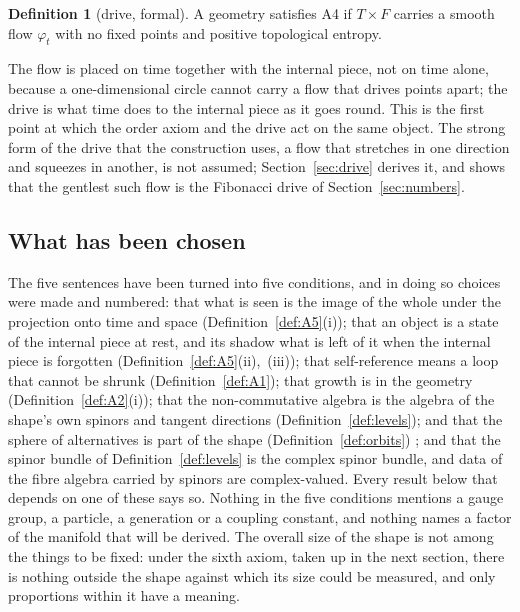 \documentclass[11pt,a4paper]{article}
\theoremstyle{plain}
\theoremstyle{definition}
\newtheorem{definition}[theorem]{Definition}
\theoremstyle{remark}
\begin{document}
\begin{definition}[drive, formal]\label{def:A4}
A geometry satisfies A4 if $T\times F$ carries a smooth flow $\varphi_{t}$ with no fixed points and positive topological entropy.
\end{definition}

The flow is placed on time together with the internal piece, not on time alone, because a one-dimensional circle cannot carry a flow that drives points apart; the drive is what time does to the internal piece as it goes round. This is the first point at which the order axiom and the drive act on the same object. The strong form of the drive that the construction uses, a flow that stretches in one direction and squeezes in another, is not assumed; Section~\ref{sec:drive} derives it, and shows that the gentlest such flow is the Fibonacci drive of Section~\ref{sec:numbers}.

\subsection{What has been chosen}\label{sec:scope}

The five sentences have been turned into five conditions, and in doing so choices were made and numbered: that what is seen is the image of the whole under the projection onto time and space (Definition~\ref{def:A5}(i)); that an object is a state of the internal piece at rest, and its shadow what is left of it when the internal piece is forgotten (Definition~\ref{def:A5}(ii),~(iii)); that self-reference means a loop that cannot be shrunk (Definition~\ref{def:A1}); that growth is in the geometry (Definition~\ref{def:A2}(i)); that the non-commutative algebra is the algebra of the shape's own spinors and tangent directions (Definition~\ref{def:levels}); and that the sphere of alternatives is part of the shape (Definition~\ref{def:orbits})%
; and that the spinor bundle of Definition~\ref{def:levels} is the complex spinor bundle, and data of the fibre algebra carried by spinors are complex-valued.
 Every result below that depends on one of these says so. Nothing in the five conditions mentions a gauge group, a particle, a generation or a coupling constant, and nothing names a factor of the manifold that will be derived. The overall size of the shape is not among the things to be fixed: under the sixth axiom, taken up in the next section, there is nothing outside the shape against which its size could be measured, and only proportions within it have a meaning.
\end{document}
